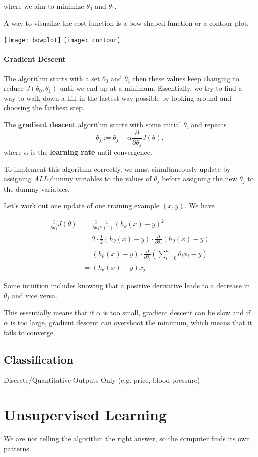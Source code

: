 \documentclass{article}
\begin{document}
where we aim to minimize $\theta_{0}$ and $\theta_{1}$. 

A way to visualize the cost function is a bow-shaped function or a contour plot. 

\begin{center}
\texttt{[image: bowplot]}
\texttt{[image: contour]}
\end{center}

\paragraph{Gradient Descent}
The algorithm starts with a set $\theta_{0}$ and $\theta_{1}$ then these values keep changing to reduce $J\left( \theta_{0}, \theta_{1} \right)$ until we end up at a minimum. Essentially, we try to find a way to walk down a hill in the fastest way possible by looking around and choosing the farthest step.

The {\bf gradient descent} algorithm starts with some initial $\theta$, and repeats
\begin{equation}
	\theta_j := \theta_j - \alpha\frac{\partial}{\partial \theta_j}J(\theta).
\end{equation} 
where $\alpha$ is the {\bf learning rate} until convergence. 

To implement this algorithm correctly, we must simultaneously update by assigning {\it ALL} dummy variables to the values of $\theta_j$ before assigning the new $\theta_j$ to the dummy variables.

Let's work out one update of one training example $(x,y)$. We have

\begin{align*}
	\frac{\partial}{\partial\theta_j}J(\theta) &= \frac{\partial}{\partial\theta_j}\frac{1}{2(1)}(h_\theta(x)-y)^2 \\
	&= 2\cdot\frac{1}{2}(h_\theta(x)-y)\cdot\frac{\partial}{\partial\theta_j}(h_\theta(x)-y)\\
	&= (h_\theta(x)-y)\cdot\frac{\partial}{\partial\theta_j}\left(\sum_{i=0}^{n}\theta_ix_i-y\right) \\
	&= (h_\theta(x)-y)x_j
\end{align*}

Some intuition includes knowing that a positive derivative leads to a decrease in $\theta_j$ and vice versa.

This essentially means that if $\alpha$ is too small, gradient descent can be slow and if $\alpha$ is too large, gradient descent can overshoot the minimum, which means that it fails to converge.


\subsection{Classification}
Discrete/Quantitative Outputs Only (e.g. price, blood pressure)

\section{Unsupervised Learning}
We are not telling the algorithm the right answer, so the computer finds its own patterns.
\end{document}
